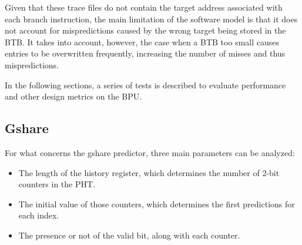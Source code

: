 Given that these trace files do not contain the target address associated with each branch instruction, the main limitation of the software model is that it does not account for mispredictions caused by the wrong target being stored in the \ac{BTB}. It takes into account, however, the case when a \ac{BTB} too small causes entries to be overwritten frequently, increasing the number of misses and thus mispredictions.

In the following sections, a series of tests is described to evaluate performance and other design metrics on the \ac{BPU}.

\subsection{Gshare}\label{sec:gshare_bench}
For what concerns the gshare predictor, three main parameters can be analyzed:
\begin{itemize}
  \item The length of the history register, which determines the number of 2-bit counters in the \ac{PHT}.
  \item The initial value of those counters, which determines the first predictions for each index.
  \item The presence or not of the valid bit, along with each counter.
\end{itemize}

